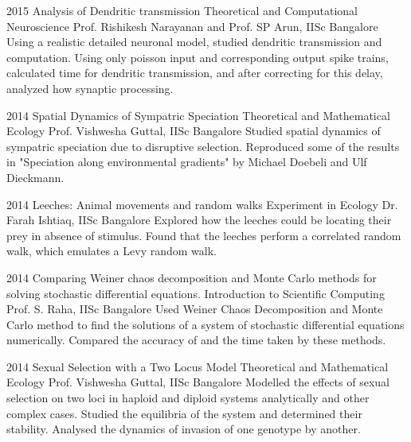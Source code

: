 \documentclass[11pt]{friggeri-cv}%
\begin{document}
\begin{entrylist}
\entry
    {2015}
    {Analysis of Dendritic transmission}
    {Theoretical and Computational Neuroscience}
    {
    Prof. Rishikesh Narayanan and Prof. SP Arun, IISc Bangalore}
    {Using a realistic detailed neuronal model, studied dendritic transmission and computation. Using only poisson input and corresponding output spike trains, calculated time for dendritic transmission, and after correcting for this delay, analyzed how synaptic processing.}    
\end{entrylist}
\begin{entrylist}
\entry
    {2014}
    {Spatial Dynamics of Sympatric Speciation}
    {Theoretical and Mathematical Ecology}
    {
    Prof. Vishwesha Guttal, IISc Bangalore}
    {Studied spatial dynamics of sympatric speciation due to disruptive selection. Reproduced some of the results in "Speciation along environmental gradients" by Michael Doebeli and Ulf Dieckmann.
    }    
\end{entrylist}
\begin{entrylist}
\entry
    {2014}
    {Leeches:
Animal movements and random walks}
    {Experiment in Ecology}
    {
    Dr. Farah Ishtiaq, IISc Bangalore}
    {Explored how the leeches could be locating their prey in absence of stimulus. Found that the leeches perform a correlated random walk, which emulates a Levy random walk.
    }    
\end{entrylist}
\begin{entrylist}
  \entry
    {2014}
    {Comparing Weiner chaos decomposition and Monte Carlo methods for solving stochastic differential equations.}
    {Introduction to Scientific Computing}
    {
    Prof. S. Raha, IISc Bangalore}
    {Used Weiner Chaos Decomposition and Monte Carlo method to find the solutions of a system of stochastic differential equations numerically. Compared the accuracy  of and the time taken by these methods.
    }    
\end{entrylist}
\begin{entrylist}
\entry
    {2014}
    {Sexual Selection with a Two Locus Model}
    {Theoretical and Mathematical Ecology}
    {
    Prof. Vishwesha Guttal, IISc Bangalore}
    {Modelled the effects of sexual selection on two loci in haploid and diploid systems analytically and other complex cases. Studied the equilibria of the system and determined their stability. Analysed the dynamics of invasion of one genotype by another. 
    }    
\end{entrylist}
\end{document}
